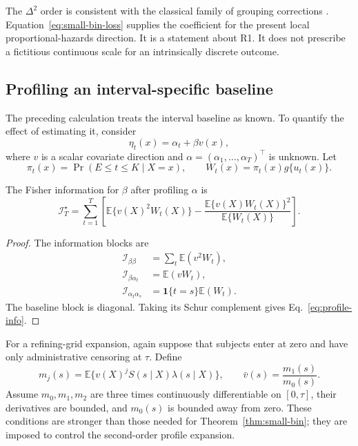 \documentclass[smallextended,natbib]{svjour3}
\begin{document}
The $\Delta^2$ order is consistent with the classical family of grouping corrections \citep{sheppard1897,mckeague1994,mckeague1996,felsenstein1998}. Equation~\eqref{eq:small-bin-loss} supplies the coefficient for the present local proportional-hazards direction. It is a statement about R1. It does not prescribe a fictitious continuous scale for an intrinsically discrete outcome.

\subsection{Profiling an interval-specific baseline}
\label{sec:profiled-info}

The preceding calculation treats the interval baseline as known. To quantify the effect of estimating it, consider
\begin{equation}
\eta_t(x)=\alpha_t+\beta v(x),
\end{equation}
where $v$ is a scalar covariate direction and $\alpha=(\alpha_1,\ldots,\alpha_T)^\top$ is unknown. Let
\begin{equation}
\pi_t(x)=\Pr(E\le t\le K\mid X=x),
\qquad
W_t(x)=\pi_t(x)g\{u_t(x)\}.
\end{equation}

\begin{lemma}
\label{lem:profile-info}
The Fisher information for $\beta$ after profiling $\alpha$ is
\begin{equation}
\mathcal I_T^\star
=
\sum_{t=1}^T\left[
\mathbb E\{v(X)^2W_t(X)\}
-
\frac{\mathbb E\{v(X)W_t(X)\}^2}{\mathbb E\{W_t(X)\}}
\right].
\label{eq:profile-info}
\end{equation}
\end{lemma}

\begin{proof}
The information blocks are
\begin{align}
\mathcal I_{\beta\beta}&=\sum_t\mathbb E(v^2W_t),\\
\mathcal I_{\beta\alpha_t}&=\mathbb E(vW_t),\\
\mathcal I_{\alpha_t\alpha_s}&=\mathbf 1\{t=s\}\mathbb E(W_t).
\end{align}
The baseline block is diagonal. Taking its Schur complement gives Eq.~\eqref{eq:profile-info}.
\end{proof}

For a refining-grid expansion, again suppose that subjects enter at zero and have only administrative censoring at $\tau$. Define
\begin{equation}
m_j(s)=\mathbb E\{v(X)^jS(s\mid X)\lambda(s\mid X)\},
\qquad
\bar v(s)=\frac{m_1(s)}{m_0(s)}.
\label{eq:moments}
\end{equation}
Assume $m_0,m_1,m_2$ are three times continuously differentiable on $[0,\tau]$, their derivatives are bounded, and $m_0(s)$ is bounded away from zero. These conditions are stronger than those needed for Theorem~\ref{thm:small-bin}; they are imposed to control the second-order profile expansion.
\end{document}

